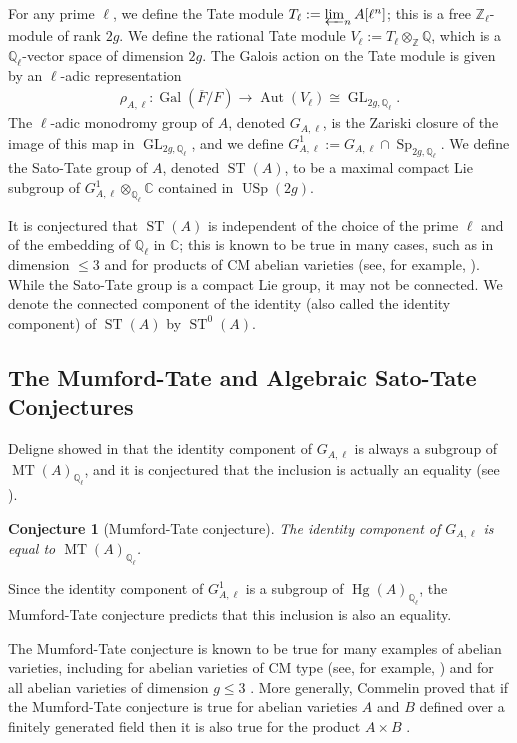 \documentclass[reqno, oneside, 12pt]{amsart}
\DeclareMathOperator{\USp}{USp}
\DeclareMathOperator{\Sp}{Sp}
\DeclareMathOperator{\GL}{GL}
\DeclareMathOperator{\ST}{ST}
\DeclareMathOperator{\Gal}{Gal}
\DeclareMathOperator{\Aut}{Aut}
\DeclareMathOperator{\Hg}{Hg}
\DeclareMathOperator{\MT}{MT}
\newcommand{\Q}{\mathbb{Q}}
\newtheorem{conjecture}[theorem]{Conjecture}
\theoremstyle{remark}
\numberwithin{equation}{section}
\begin{document}
For any prime $\ell$, we define the Tate module $T_{\ell}:=\varprojlim_{n} A[\ell^n]$; this is a free $\mathbb{Z}_{\ell}$-module of rank $2g$. We define the rational Tate module $V_{\ell}:=T_{\ell}\otimes_{\mathbb{Z}} \mathbb{Q}$, which is a $\mathbb{Q}_{\ell}$-vector space of dimension $2g.$ The Galois action on the Tate module is given by an $\ell$-adic representation 
\begin{align}\label{eqn:artinrepresntation}
    \rho_{A,\ell}:\Gal(\overline{F}/F) \rightarrow \Aut(V_{\ell}) \cong \GL_{2g,\mathbb{Q}_{\ell}}.
\end{align}
The $\ell$-adic monodromy group of $A$, denoted $G_{A,\ell}$, is the Zariski closure of the image of this map in $\GL_{2g,\mathbb{Q}_{\ell}}$, and we define $G^{1}_{A,\ell}:=G_{A,\ell}\cap \Sp_{2g,\mathbb{Q}_{\ell}}$. We define the {Sato-Tate group} of $A$, denoted   $\ST(A)$, to be a maximal compact Lie subgroup of $G^{1}_{A,\ell}\otimes_{\mathbb{Q}_{\ell}}\mathbb{C}$ contained in $\USp(2g)$. 

It is conjectured that $\ST(A)$ is independent of the choice of the prime $\ell$ and of the embedding of $\mathbb{Q}_\ell$ in $\mathbb{C}$; this is known to be true in many cases, such as in dimension $\leq 3$ and for products of CM abelian varieties (see, for example, \cite{Banaszak2015, Joh17}). While the Sato-Tate group is a compact Lie group, it may not be connected. We denote  the connected component of the  identity  (also called the identity component) of $\ST(A)$ by  $\ST^0(A)$.


\subsection{The Mumford-Tate and Algebraic Sato-Tate Conjectures}\label{sec:backgroundMTConjecture}
Deligne showed in \cite{Deligne1982}  that the identity component of $G_{A,\ell}$ is always a subgroup of $\MT(A)_{\Q_\ell}$, and it is conjectured that the inclusion is actually an equality (see \cite{SutherlandNotes}).
\begin{conjecture}[Mumford-Tate conjecture]
The identity component of $G_{A,\ell}$ is equal to $\MT(A)_{\Q_\ell}$.
\end{conjecture}
Since the identity component of $G^{1}_{A,\ell}$ is a subgroup of $\Hg(A)_{\Q_\ell}$, the Mumford-Tate conjecture predicts that this inclusion is also an equality. 

The Mumford-Tate conjecture is known to be true for many examples of abelian varieties, including for abelian varieties of CM type (see, for example, \cite{Pohlmann1968, Yu2015}) and for all abelian varieties of dimension $g\leq 3$ \cite[Theorem 6.11]{Banaszak2015}. More generally, Commelin proved that if the Mumford-Tate conjecture is true for abelian varieties $A$ and $B$ defined over a finitely generated field then it is also true for the product $A\times B$ \cite{Commelin2019}.
\end{document}
